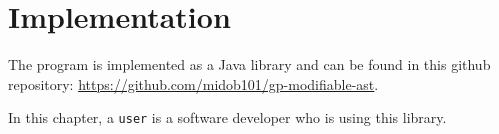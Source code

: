 \section{Implementation}

The program is implemented as a Java library and can be found in this github repository: \url{https://github.com/midob101/gp-modifiable-ast}.

In this chapter, a \verb|user| is a software developer who is using this library.









